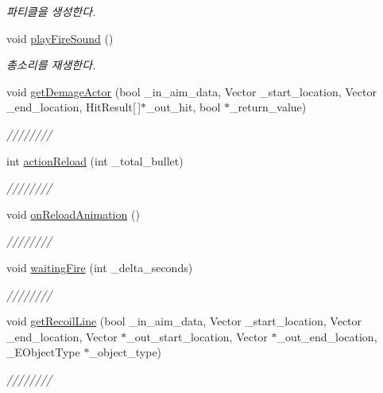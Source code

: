 \begin{DoxyCompactItemize}
\begin{DoxyCompactList}\small\item\em 파티클을 생성한다. \end{DoxyCompactList}\item 
void \hyperlink{class_weapons___actor_a5452db7714a6fd6fc8d4e60387ca1484}{play\+Fire\+Sound} ()
\begin{DoxyCompactList}\small\item\em 총소리를 재생한다. \end{DoxyCompactList}\item 
void \hyperlink{class_weapons___actor_a62f4a9add9f4521b19f82e38777fcc85}{get\+Demage\+Actor} (bool \+\_\+in\+\_\+aim\+\_\+data, Vector \+\_\+start\+\_\+location, Vector \+\_\+end\+\_\+location, Hit\+Result\mbox{[}$\,$\mbox{]}$\ast$\+\_\+out\+\_\+hit, bool $\ast$\+\_\+return\+\_\+value)
\begin{DoxyCompactList}\small\item\em //////// \end{DoxyCompactList}\item 
int \hyperlink{class_weapons___actor_ab1b1e922088fe0747842df3599dbb7b3}{action\+Reload} (int \+\_\+total\+\_\+bullet)
\begin{DoxyCompactList}\small\item\em //////// \end{DoxyCompactList}\item 
void \hyperlink{class_weapons___actor_a8b36c9a754942e42e22601add407e257}{on\+Reload\+Animation} ()
\begin{DoxyCompactList}\small\item\em //////// \end{DoxyCompactList}\item 
void \hyperlink{class_weapons___actor_aad412298d60d3ffd391c1e3b925eb206}{waiting\+Fire} (int \+\_\+delta\+\_\+seconds)
\begin{DoxyCompactList}\small\item\em //////// \end{DoxyCompactList}\item 
void \hyperlink{class_weapons___actor_a8e5bd4c8a55510f6b7db7674273128fa}{get\+Recoil\+Line} (bool \+\_\+in\+\_\+aim\+\_\+data, Vector \+\_\+start\+\_\+location, Vector \+\_\+end\+\_\+location, Vector $\ast$\+\_\+out\+\_\+start\+\_\+location, Vector $\ast$\+\_\+out\+\_\+end\+\_\+location, \+\_\+\+E\+Object\+Type $\ast$\+\_\+object\+\_\+type)
\begin{DoxyCompactList}\small\item\em //////// \end{DoxyCompactList}\item 

\end{DoxyCompactItemize}
